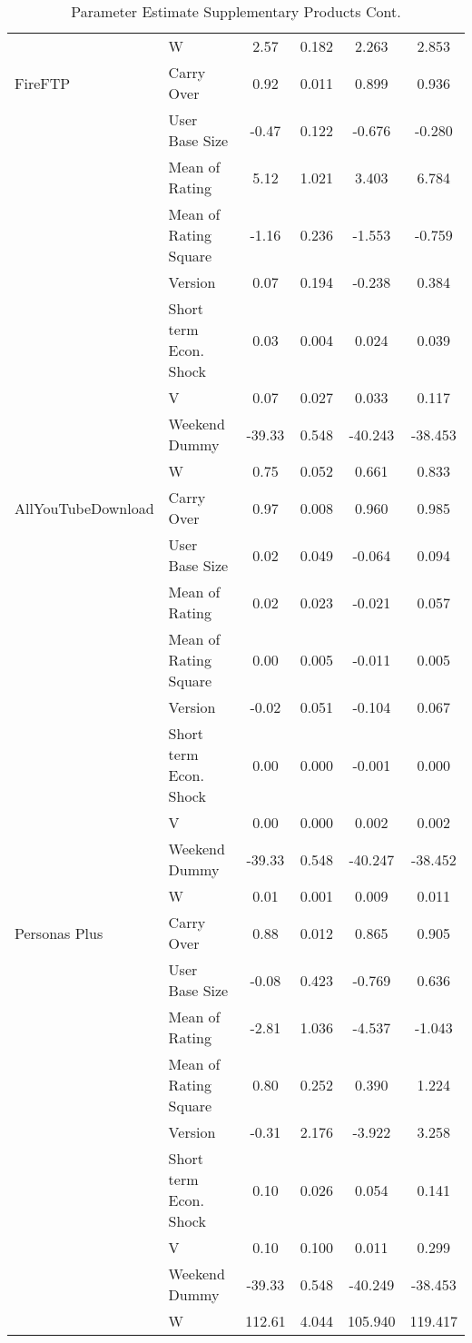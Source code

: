 \documentclass[mksc,nonblindrev]{informs3}
\begin{document}
\begin{table}
\begin{tabular}{llcccc}
	&	W	&	2.57	&	0.182	&	2.263	&	2.853	\\
FireFTP	&	Carry Over	&	0.92	&	0.011	&	0.899	&	0.936	\\
	&	User Base Size	&	-0.47	&	0.122	&	-0.676	&	-0.280	\\
	&	Mean of Rating	&	5.12	&	1.021	&	3.403	&	6.784	\\
	&	Mean of Rating Square	&	-1.16	&	0.236	&	-1.553	&	-0.759	\\
	&	Version	&	0.07	&	0.194	&	-0.238	&	0.384	\\
	&	Short term Econ. Shock	&	0.03	&	0.004	&	0.024	&	0.039	\\
	&	V	&	0.07	&	0.027	&	0.033	&	0.117	\\
	&	Weekend Dummy	&	-39.33	&	0.548	&	-40.243	&	-38.453	\\
	&	W	&	0.75	&	0.052	&	0.661	&	0.833	\\
AllYouTubeDownload	&	Carry Over	&	0.97	&	0.008	&	0.960	&	0.985	\\
	&	User Base Size	&	0.02	&	0.049	&	-0.064	&	0.094	\\
	&	Mean of Rating	&	0.02	&	0.023	&	-0.021	&	0.057	\\
	&	Mean of Rating Square	&	0.00	&	0.005	&	-0.011	&	0.005	\\
	&	Version	&	-0.02	&	0.051	&	-0.104	&	0.067	\\
	&	Short term Econ. Shock	&	0.00	&	0.000	&	-0.001	&	0.000	\\
	&	V	&	0.00	&	0.000	&	0.002	&	0.002	\\
	&	Weekend Dummy	&	-39.33	&	0.548	&	-40.247	&	-38.452	\\
	&	W	&	0.01	&	0.001	&	0.009	&	0.011	\\
Personas Plus	&	Carry Over	&	0.88	&	0.012	&	0.865	&	0.905	\\
	&	User Base Size	&	-0.08	&	0.423	&	-0.769	&	0.636	\\
	&	Mean of Rating	&	-2.81	&	1.036	&	-4.537	&	-1.043	\\
	&	Mean of Rating Square	&	0.80	&	0.252	&	0.390	&	1.224	\\
	&	Version	&	-0.31	&	2.176	&	-3.922	&	3.258	\\
	&	Short term Econ. Shock	&	0.10	&	0.026	&	0.054	&	0.141	\\
	&	V	&	0.10	&	0.100	&	0.011	&	0.299	\\
	&	Weekend Dummy	&	-39.33	&	0.548	&	-40.249	&	-38.453	\\
	&	W	&	112.61	&	4.044	&	105.940	&	119.417	\\
		\end{tabular}
	\caption{Parameter Estimate Supplementary Products Cont.}
	\label{tab:ParameterEstimateSupplementaryProducts}
\end{table}
\end{document}
